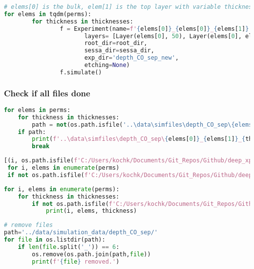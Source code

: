 \begin{lstlisting}[language=Python]
# elems[0] is the bulk, elem[1] is the top layer with variable thickness
for elems in tqdm(perms):
        for thickness in thicknesses:
                f = Experiment(name=f'{elems[0]}_{elems[0]}_{elems[1]}',
                       layers= [Layer(elems[0], 50), Layer(elems[0], elems[1])], 
                       root_dir=root_dir, 
                       sessa_dir=sessa_dir,
                       exp_dir='depth_CO_sep_new',
                       etching=None)
                f.simulate()
\end{lstlisting}

\hypertarget{check-if-all-files-done}{%
\subsubsection*{Check if all files done}\label{check-if-all-files-done}}

\begin{lstlisting}[language=Python]
for elems in perms:
    for thickness in thicknesses:
        path = not(os.path.isfile('..\data\simfiles\depth_CO_sep\{elems[0]}_{elems[1]}_{thickness}.txt'))
    if path:
        print(f'..\data\simfiles\depth_CO_sep\{elems[0]}_{elems[1]}_{thickness}.txt')
        break
\end{lstlisting}

\begin{lstlisting}[language=Python]
[(i, os.path.isfile(f'C:/Users/kochk/Documents/Git_Repos/Github/deep_xps/data/simfiles/depth_CO_sep_new/{elems[0]}_{elems[1]}.txt')) 
 for i, elems in enumerate(perms) 
 if not os.path.isfile(f'C:/Users/kochk/Documents/Git_Repos/Github/deep_xps/data/simfiles/depth_CO_sep_new/{elems[0]}_{elems[1]}.txt')]
\end{lstlisting}

\begin{lstlisting}[language=Python]
for i, elems in enumerate(perms):
    for thickness in thicknesses:
        if not os.path.isfile(f'C:/Users/kochk/Documents/Git_Repos/Github/deep_xps/data/simfiles/depth_CO_sep_new/{elems[0]}_{elems[1]}_{thickness}.txt'):
            print(i, elems, thickness)
\end{lstlisting}

\begin{lstlisting}[language=Python]
# remove files
path='../data/simulation_data/depth_CO_sep/'
for file in os.listdir(path):
    if len(file.split('_')) == 6:
        os.remove(os.path.join(path,file))
        print(f'{file} removed.')
\end{lstlisting}

